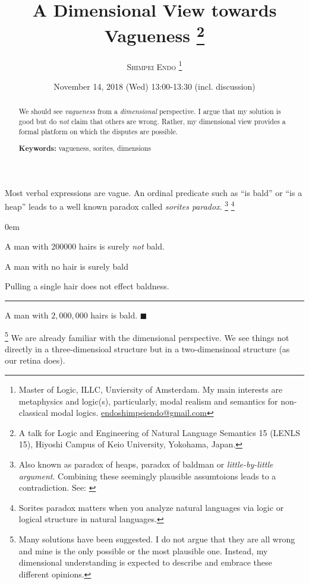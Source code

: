 \documentclass{tufte-handout}
\title{{\bf{A Dimensional View towards Vagueness} } %
\thanks{A talk for Logic and Engineering of Natural Language Semantics 15 (LENLS 15), Hiyoshi Campus of Keio University, Yokohama, Japan. }
}
\author{\textsc{Shimpei Endo
\thanks{Master of Logic, ILLC, Unviersity of Amsterdam.
My main interests are metaphysics and logic(s), particularly, modal realism and semantics for non-classical modal logics.
\Letter \url{endoshimpeiendo@gmail.com}
}
}
}
\date{November 14, 2018 (Wed) 13:00-13:30 (incl. discussion)} %
\begin{document}
\maketitle %

\begin{abstract}
We should see \emph{vagueness} from a \emph{dimensional} perspective.
I argue that my solution is good but do \emph{not} claim that others are wrong.
Rather, my dimensional view provides a formal platform on which the disputes are possible.

\noindent \textbf{Keywords:} vagueness, sorites, dimensions
\end{abstract}

Most verbal expressions are vague.
 An ordinal predicate such as ``is bald'' or ``is a heap'' leads to a well known paradox called \emph{sorites paradox}.
\footnote{Also known as paradox of heaps, paradox of baldman or \emph{little-by-little argument}. Combining these seemingly plausible assumtoions leads to a contradiction. See:
\cite{Hyde2011-HYDTSP}
}
\footnote{Sorites paradox matters when you analyze natural languages via logic or logical structure in natural languages. }


\begin{description}
\itemsep0em

\item	[Obviously non-bald case:] A man with 200000 hairs is surely \emph{not} bald.

\item	[Obviously bald case:] A man with no hair is surely bald

\item	[Tolerance Principle:]
Pulling a single hair does not effect baldness.
\begin{spacing}{0}

\noindent\rule{10cm}{0.4pt}
\end{spacing}

\item [Unwelcome conclusion:]
A man with $2,000,000$ hairs is bald.
$\blacksquare$

\end{description}

\footnote{Many solutions have been suggested.
I do not argue that they are all wrong and mine is the only possible or the most plausible one. Instead, my dimensional understanding is expected to describe and embrace these different opinions.}
We are already familiar with the dimensional perspective.
We see things not directly in a three-dimensioal structure but in a two-dimensinoal structure (as our retina does).
\end{document}
